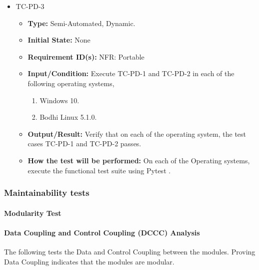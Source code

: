 \documentclass[12pt, titlepage]{article}
\begin{document}
\begin{itemize}
\item{TC-PD-3\\}
\begin{itemize}

\item{\textbf{Type:}} Semi-Automated, Dynamic.
					
\item{\textbf{Initial State:}} None

\item{\textbf{Requirement ID(s):}} NFR: Portable
					
\item{\textbf{Input/Condition:}}  Execute TC-PD-1 and TC-PD-2 in each of the following 
operating systems,

\begin{enumerate}
\item Windows 10.
\item Bodhi Linux 5.1.0. 
\end {enumerate}
					
\item{\textbf{Output/Result:}} Verify that on each of the operating system, the test 
cases TC-PD-1 and TC-PD-2 passes. 

\item{\textbf{How the test will be performed:}}  On each of the Operating systems,
execute the functional test suite using  Pytest \cite{Pytest}. 

\end{itemize}
\end{itemize}


\subsubsection{Maintainability tests}

\paragraph{Modularity Test}

\paragraph{Data Coupling and Control Coupling (DCCC) Analysis}

The following tests the Data and Control Coupling between the modules. Proving Data Coupling indicates that
the modules are modular. 
\end{document}
